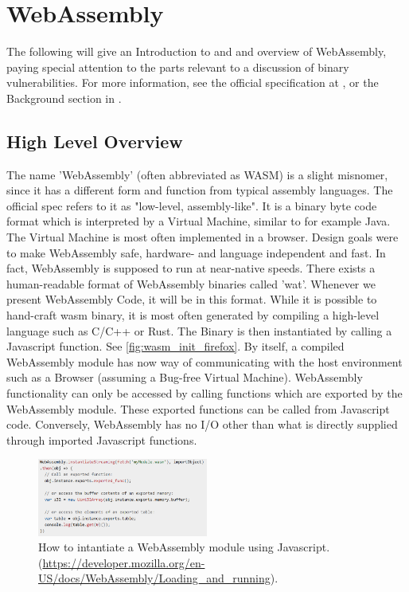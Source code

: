 \documentclass[sigconf]{acmart}
\begin{document}
\section{WebAssembly}
\label{sec:wasm}
The following will give an Introduction to and and overview of WebAssembly, paying special attention to the parts relevant to a discussion of binary vulnerabilities. For more information, see the official specification at \cite{webAssembly_spec_2021}, or the Background section in \cite{lehmann_everything_2020}. 

\subsection{High Level Overview}
The name 'WebAssembly' (often abbreviated as WASM) is a slight misnomer, since it has a different form and function from typical assembly languages. The official spec refers to it as "low-level, assembly-like". It is a binary byte code format which is interpreted by a Virtual Machine, similar to for example Java. The Virtual Machine is most often implemented in a browser. Design goals were to make WebAssembly safe, hardware- and language independent and fast. In fact, WebAssembly is supposed to run at near-native speeds. There exists a human-readable format of WebAssembly binaries called 'wat'. Whenever we present WebAssembly Code, it will be in this format. While it is possible to hand-craft wasm binary, it is most often generated by compiling a high-level language such as C/C++ or Rust. The Binary is then instantiated by calling a Javascript function. See \ref{fig:wasm_init_firefox}. By itself, a compiled WebAssembly module has now way of communicating with the host environment such as a Browser (assuming a Bug-free Virtual Machine). WebAssembly functionality can only be accessed by calling functions which are exported by the WebAssembly module. These exported functions can be called from Javascript code. Conversely, WebAssembly has no I/O other than what is directly supplied through imported Javascript functions. 

\begin{figure}[h]
  \centering
  \includegraphics[width=0.5\textwidth]{wasm_init_firefox}
  \caption{How to intantiate a WebAssembly module using Javascript. (\url{https://developer.mozilla.org/en-US/docs/WebAssembly/Loading_and_running}).}
\end{figure}
\end{document}

